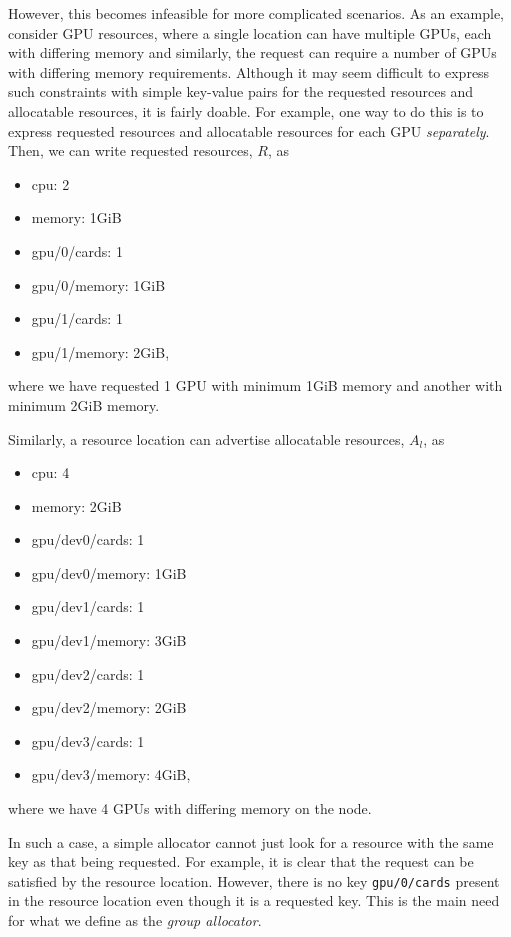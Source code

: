 \documentclass[12pt,onecolumn]{IEEEtran}
\begin{document}
However, this becomes infeasible for more complicated scenarios.
As an example, consider GPU resources, where a single location
can have multiple GPUs, each with differing memory
and similarly, the request can require a number of GPUs with
differing memory requirements.
Although it may seem difficult to express such constraints with simple
key-value pairs for the requested resources and allocatable resources,
it is fairly doable.
For example, one way to do this is to express requested resources and
allocatable resources for each GPU {\em separately}.
Then, we can write requested resources, $R$, as
\ttfamily
\begin{itemize}
\item[] cpu: 2
\item[] memory: 1GiB
\item[] gpu/0/cards: 1
\item[] gpu/0/memory: 1GiB
\item[] gpu/1/cards: 1
\item[] gpu/1/memory: 2GiB,
\end{itemize}
\normalfont
where 
we have requested 1 GPU with minimum 1GiB memory and another with
minimum 2GiB memory.

Similarly, a resource location can advertise allocatable resources, $A_l$, as
\ttfamily
\begin{itemize}
\item[] cpu: 4
\item[] memory: 2GiB
\item[] gpu/dev0/cards: 1
\item[] gpu/dev0/memory: 1GiB
\item[] gpu/dev1/cards: 1
\item[] gpu/dev1/memory: 3GiB
\item[] gpu/dev2/cards: 1
\item[] gpu/dev2/memory: 2GiB
\item[] gpu/dev3/cards: 1
\item[] gpu/dev3/memory: 4GiB,
\end{itemize}
\normalfont
where we have 4 GPUs with differing memory on the node.

In such a case, a simple allocator cannot just look for a resource with
the same key as that being requested.
For example, it is clear that the request can be satisfied by
the resource location.
However, there is no key \texttt{gpu/0/cards} present in the resource
location even though it is a requested key.
This is the main need for what we define as the {\em group allocator}.
\end{document}
